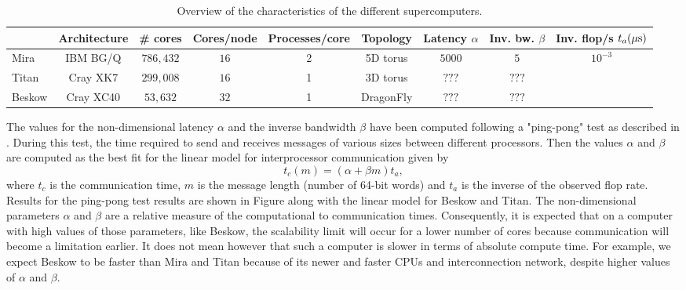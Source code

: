 \documentclass{sig-alternate}
\begin{document}
\begin{table}
\centering
\caption{Overview of the characteristics of the different supercomputers.}
\begin{tabular}{l|cccccccc} 
\hline
 & Architecture & \# cores & Cores/node & Processes/core & Topology & Latency
 $\alpha$ & Inv. bw.  $\beta$ & Inv. flop/s $t_a (\unit[]{\mu s})$\\
 \hline
Mira & IBM BG/Q & $786,432$ & $16$ &2& 5D torus & $5000$ & $5$ & $10^{-3}$\\ 
Titan & Cray XK7 & $299,008$ & $16$ &1&3D torus& $???$ & $???$ &\\ %
Beskow & Cray XC40 & $53,632$ & $32$ &1&DragonFly & $???$ & $???$ &\\ %
\hline
\end{tabular}
\label{tab:computer_charac}
\end{table}

The values for the non-dimensional latency $\alpha$ and the inverse bandwidth $\beta$ have been computed following a "ping-pong" test as described in \cite{fischer:scaling}. During this test, the time required to send and receives messages of various sizes between different processors. Then the values $\alpha$ and $\beta$ are computed as the best fit for the linear model for interprocessor communication given by
\begin{equation}
 t_c(m) = (\alpha + \beta m) t_a,
\end{equation}
where $t_c$ is the communication time, $m$ is the message length (number of 64-bit words) and $t_a$ is the inverse of the observed flop rate. Results for the ping-pong test results are shown in Figure  along with the linear model for Beskow and Titan. The non-dimensional parameters $\alpha$ and $\beta$ are a relative measure of the computational to communication times. Consequently, it is expected that on a computer with high values of those parameters, like Beskow, the scalability limit will occur for a lower number of cores because communication will become a limitation earlier. It does not mean however that such a computer is slower in terms of absolute compute time. For example, we expect Beskow to be faster than Mira and Titan because of its newer and faster CPUs and interconnection network, despite higher values of $\alpha$ and $\beta$.
\end{document}
